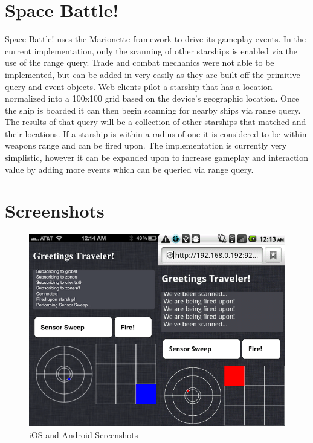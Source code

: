 \documentclass[12pt]{report}	%
\theoremstyle{definition}
\theoremstyle{remark}
\begin{document}
\section{Space Battle!}

Space Battle! uses the Marionette framework to drive its gameplay
events. In the current implementation, only the scanning of other
starships is enabled via the use of the range query. Trade and combat
mechanics were not able to be implemented, but can be added in very
easily as they are built off the primitive query and event objects. Web
clients pilot a starship that has a location normalized into a 100x100
grid based on the device's geographic location. Once the ship is boarded
it can then begin scanning for nearby ships via range query. The results
of that query will be a collection of other starships that matched and
their locations. If a starship is within a radius of one it is
considered to be within weapons range and can be fired upon. The
implementation is currently very simplistic, however it can be expanded
upon to increase gameplay and interaction value by adding more events
which can be queried via range query.

\section{Screenshots}

\begin{figure}[h!]
\centering
\includegraphics[scale=0.6]{4.png}
\caption{iOS and Android Screenshots}
\label{screenshot}
\end{figure}
\end{document}
